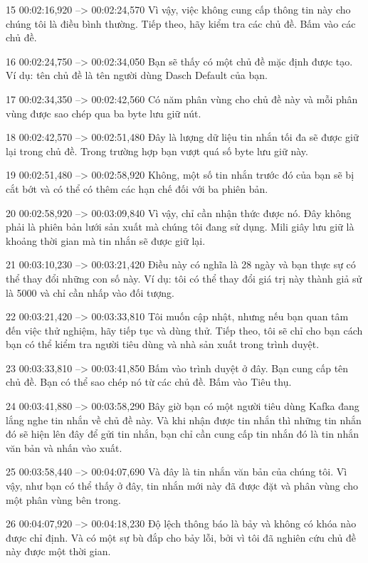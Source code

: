 15
00:02:16,920 --> 00:02:24,570
Vì vậy, việc không cung cấp thông tin này cho chúng tôi là điều bình thường.  Tiếp theo, hãy kiểm tra các chủ đề.  Bấm vào các chủ đề.

16
00:02:24,750 --> 00:02:34,050
Bạn sẽ thấy có một chủ đề mặc định được tạo.  Ví dụ: tên chủ đề là tên người dùng Dasch Default của bạn.

17
00:02:34,350 --> 00:02:42,560
Có năm phân vùng cho chủ đề này và mỗi phân vùng được sao chép qua ba byte lưu giữ nút.

18
00:02:42,570 --> 00:02:51,480
Đây là lượng dữ liệu tin nhắn tối đa sẽ được giữ lại trong chủ đề.  Trong trường hợp bạn vượt quá số byte lưu giữ này.

19
00:02:51,480 --> 00:02:58,920
Không, một số tin nhắn trước đó của bạn sẽ bị cắt bớt và có thể có thêm các hạn chế đối với ba phiên bản.

20
00:02:58,920 --> 00:03:09,840
Vì vậy, chỉ cần nhận thức được nó.  Đây không phải là phiên bản lưới sản xuất mà chúng tôi đang sử dụng.  Mili giây lưu giữ là khoảng thời gian mà tin nhắn sẽ được giữ lại.

21
00:03:10,230 --> 00:03:21,420
Điều này có nghĩa là 28 ngày và bạn thực sự có thể thay đổi những con số này.  Ví dụ: tôi có thể thay đổi giá trị này thành giả sử là 5000 và chỉ cần nhấp vào đối tượng.

22
00:03:21,420 --> 00:03:33,810
Tôi muốn cập nhật, nhưng nếu bạn quan tâm đến việc thử nghiệm, hãy tiếp tục và dùng thử.  Tiếp theo, tôi sẽ chỉ cho bạn cách bạn có thể kiểm tra người tiêu dùng và nhà sản xuất trong trình duyệt.

23
00:03:33,810 --> 00:03:41,850
Bấm vào trình duyệt ở đây.  Bạn cung cấp tên chủ đề.  Bạn có thể sao chép nó từ các chủ đề.  Bấm vào Tiêu thụ.

24
00:03:41,880 --> 00:03:58,290
Bây giờ bạn có một người tiêu dùng Kafka đang lắng nghe tin nhắn về chủ đề này.  Và khi nhận được tin nhắn thì những tin nhắn đó sẽ hiện lên đây để gửi tin nhắn, bạn chỉ cần cung cấp tin nhắn đó là tin nhắn văn bản và nhấn vào xuất.

25
00:03:58,440 --> 00:04:07,690
Và đây là tin nhắn văn bản của chúng tôi.  Vì vậy, như bạn có thể thấy ở đây, tin nhắn mới này đã được đặt và phân vùng cho một phân vùng bên trong.

26
00:04:07,920 --> 00:04:18,230
Độ lệch thông báo là bảy và không có khóa nào được chỉ định.  Và có một sự bù đắp cho bảy lỗi, bởi vì tôi đã nghiên cứu chủ đề này được một thời gian.

